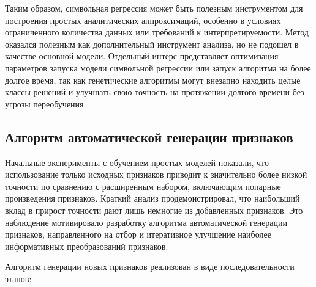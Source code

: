 \documentclass[a4paper,12pt]{article}
\begin{document}
    Таким образом, символьная регрессия может быть полезным инструментом для построения простых аналитических аппроксимаций, особенно в условиях ограниченного количества данных или требований к интерпретируемости. Метод оказался полезным как дополнительный инструмент анализа, но не подошел в качестве основной модели. Отдельный интерс представляет оптимизация параметров запуска модели символьной регрессии или запуск алгоритма на более долгое время, так как генетические алгоритмы могут внезапно находить целые классы решений и улучшать свою точность на протяжении долгого времени без угрозы переобучения. 

 \subsection{Алгоритм автоматической генерации признаков}
 
    Начальные эксперименты с обучением простых моделей показали, что использование только исходных признаков приводит к значительно более низкой точности по сравнению с расширенным набором, включающим попарные произведения признаков. Краткий анализ продемонстрировал, что наибольший вклад в прирост точности дают лишь немногие из добавленных признаков. Это наблюдение мотивировало разработку алгоритма автоматической генерации признаков, направленного на отбор и итеративное улучшение наиболее информативных преобразований признаков.
  
    Алгоритм генерации новых признаков реализован в виде последовательности этапов:
\end{document}
